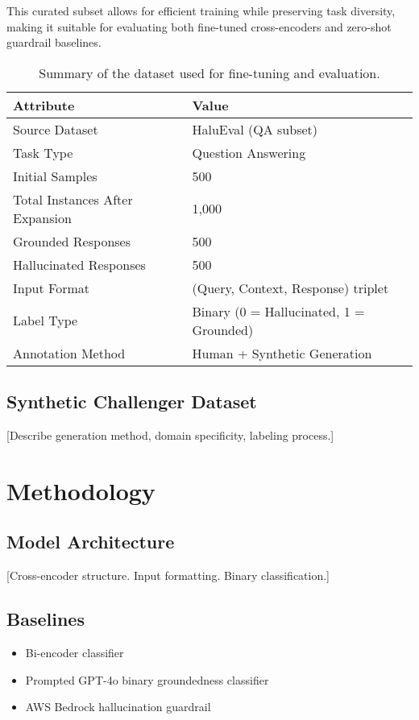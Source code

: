 \documentclass[11pt]{article}
\begin{document}
This curated subset allows for efficient training while preserving task diversity, making it suitable for evaluating both fine-tuned cross-encoders and zero-shot guardrail baselines.
\begin{table}[h]
\centering
\begin{tabular}{|l|l|}
\hline
\textbf{Attribute} & \textbf{Value} \\
\hline
Source Dataset & HaluEval (QA subset) \\
Task Type & Question Answering \\
Initial Samples & 500 \\
Total Instances After Expansion & 1,000 \\
Grounded Responses & 500 \\
Hallucinated Responses & 500 \\
Input Format & (Query, Context, Response) triplet \\
Label Type & Binary (0 = Hallucinated, 1 = Grounded) \\
Annotation Method & Human + Synthetic Generation \\
\hline
\end{tabular}
\caption{Summary of the dataset used for fine-tuning and evaluation.}
\label{tab:data_summary}
\end{table}


\subsection{Synthetic Challenger Dataset}
[Describe generation method, domain specificity, labeling process.]

\section{Methodology}
\subsection{Model Architecture}
[Cross-encoder structure. Input formatting. Binary classification.]

\subsection{Baselines}
\begin{itemize}
    \item Bi-encoder classifier
    \item Prompted GPT-4o binary groundedness classifier
    \item AWS Bedrock hallucination guardrail
\end{itemize}
\end{document}
